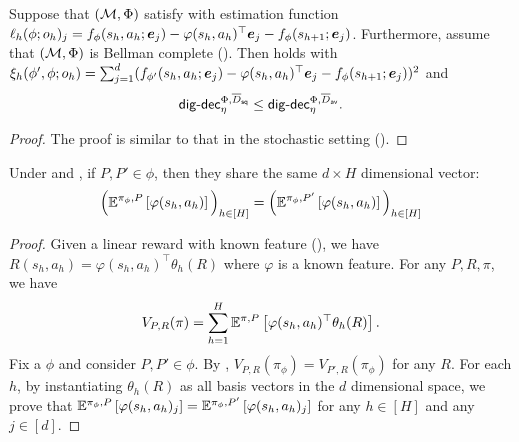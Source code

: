 \begin{lemma}\label{lem: connecting two digdec hybrid}
    Suppose that $(\mathcal{M},\Phi)$ satisfy  with estimation function $\ell_h(\phi; o_h)_j = f_\phi(s_h,a_h; \bm{e}_j) - \varphi(s_h,a_h)^\top \bm{e}_j - f_\phi(s_{h+1}; \bm{e}_j)$. Furthermore, assume that $(\mathcal{M}, \Phi)$ is Bellman complete (). Then  holds with $\xi_h(\phi', \phi; o_h) = \sum_{j=1}^d (f_{\phi'}(s_h,a_h; \bm{e}_j) - \varphi(s_h,a_h)^\top \bm{e}_j - f_{\phi}(s_{h+1}; \bm{e}_j))^2$ and 
    \begin{align*} 
        \mathsf{dig}\text{-}\mathsf{dec}_\eta^{\Phi, \overline{D}_{\mathsf{sq}}} \leq \mathsf{dig}\text{-}\mathsf{dec}_\eta^{\Phi, \overline{D}_{\mathsf{av}}}. 
    \end{align*}
\end{lemma}
\begin{proof}
   The proof is similar to that in the stochastic setting (). 
\end{proof}

\begin{lemma}\label{lem: reward same}
Under  and , if $P, P'\in\phi$, then they share the same $d\times H$ dimensional vector: 
\begin{align*}
    \Big(\mathbb{E}^{\pi_\phi, P}\left[\varphi(s_h,a_h)\right]\Big)_{h\in[H]} = \Big(\mathbb{E}^{\pi_\phi, P'}\left[\varphi(s_h,a_h)\right]\Big)_{h\in[H]}
\end{align*}
  
\end{lemma}
\begin{proof}
    Given a linear reward with known feature (), we have $R(s_h,a_h) = \varphi(s_h,a_h)^\top \theta_h(R)$ where $\varphi$ is a known feature. For any $P, R, \pi$, we have
\begin{align*}
    V_{P, R}(\pi) = \sum_{h=1}^H \mathbb{E}^{\pi, P}\left[\varphi(s_h,a_h)^\top\theta_h(R)\right].  
\end{align*}
Fix a $\phi$ and consider $P, P'\in\phi$. By , $V_{P,R}(\pi_\phi) = V_{P', R}(\pi_\phi)$ for any $R$. For each $h$, by instantiating $\theta_h(R)$ as all basis vectors in the $d$ dimensional space, we prove that  $\mathbb{E}^{\pi_\phi, P}\left[\varphi(s_h,a_h)_j\right] = \mathbb{E}^{\pi_\phi, P'}\left[\varphi(s_h,a_h)_j\right]$ for any $h\in[H]$ and any $j\in[d]$. 
\end{proof}


